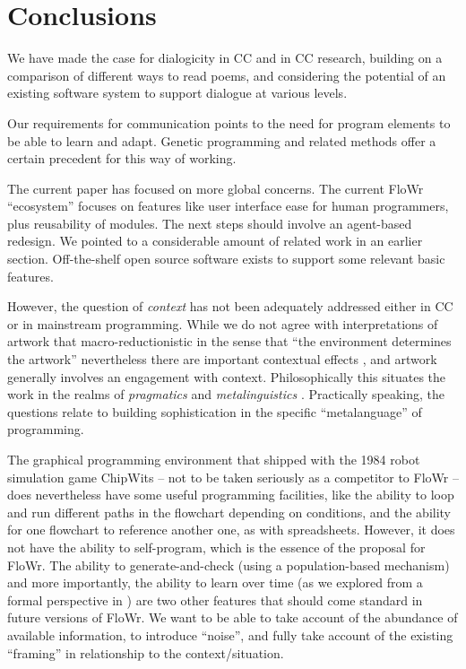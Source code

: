\section{Conclusions}
\label{sec:conc}

We have made the case for dialogicity in CC and in CC research,
building on a comparison of different ways to read poems, and
considering the potential of an existing software system to support
dialogue at various levels.

Our requirements for communication points to the need for program
elements to be able to learn and adapt.  Genetic programming
\cite{koza1992genetic} and related methods offer a certain precedent
for this way of working.

The current paper has focused on more global concerns.  The current
FloWr ``ecosystem'' focuses on features like user interface ease for
human programmers, plus reusability of modules.  The next steps should
involve an agent-based redesign.  We pointed to a considerable amount
of related work in an earlier section.  Off-the-shelf open source
software exists to support some relevant basic features.

However, the question of \emph{context} has not been adequately
addressed either in CC or in mainstream programming.  While we do not
agree with interpretations of artwork that macro-reductionistic in the
sense that ``the environment determines the artwork'' nevertheless
there are important contextual effects \cite{geertz1976art}, and
artwork generally involves an engagement with context.
Philosophically this situates the work in the realms of
\emph{pragmatics} \cite{sep-pragmatics} and \emph{metalinguistics}
\cite{gombert1994development}.  Practically speaking, the questions
relate to building sophistication in the specific ``metalanguage'' of
programming.

The graphical programming environment that shipped with the 1984 robot
simulation game ChipWits -- not to be taken seriously as a competitor
to FloWr -- does nevertheless have some useful programming facilities,
like the ability to loop and run different paths in the flowchart
depending on conditions, and the ability for one flowchart to
reference another one, as with spreadsheets.  However, it does not
have the ability to self-program, which is the essence of the proposal
for FloWr.  The ability to generate-and-check (using a
population-based mechanism) and more importantly, the ability to learn
over time (as we explored from a formal perspective in
\cite{colton-assessingprogress}) are two other features that should
come standard in future versions of FloWr.  We want to be able to take
account of the abundance of available information, to introduce
``noise'', and fully take account of the existing ``framing'' in
relationship to the context/situation.

